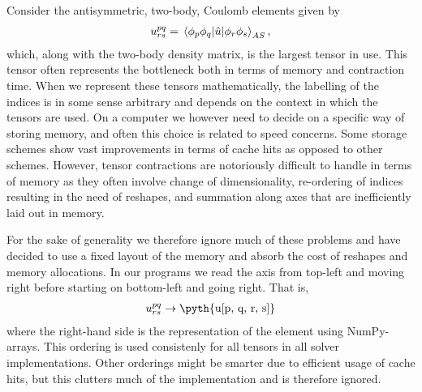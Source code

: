         Consider the antisymmetric, two-body, Coulomb elements given by
        \begin{align}
            u^{pq}_{rs}
            = \mel*{\phi_p\phi_q}{\hat{u}}{\phi_r\phi_s}_{AS},
        \end{align}
        which, along with the two-body density matrix, is the largest tensor in
        use.
        This tensor often represents the bottleneck both in terms of memory and
        contraction time.
        When we represent these tensors mathematically, the labelling of the
        indices is in some sense arbitrary and depends on the context in which
        the tensors are used.
        On a computer we however need to decide on a specific way of storing
        memory, and often this choice is related to speed concerns.
        Some storage schemes show vast improvements in terms of cache hits as
        opposed to other schemes.
        However, tensor contractions are notoriously difficult to handle in
        terms of memory as they often involve change of dimensionality,
        re-ordering of indices resulting in the need of reshapes, and summation
        along axes that are inefficiently laid out in memory.

        For the sake of generality we therefore ignore much of these problems
        and have decided to use a fixed layout of the memory and absorb the cost
        of reshapes and memory allocations.
        In our programs we read the axis from top-left and moving right before
        starting on bottom-left and going right.
        That is,
        \begin{align}
            \twoten^{pq}_{rs}
            \to \text{\pyth{u[p, q, r, s]}}
        \end{align}
        where the right-hand side is the representation of the element using
        NumPy-arrays.
        This ordering is used consistenly for all tensors in all solver
        implementations.
        Other orderings might be smarter due to efficient usage of cache hits,
        but this clutters much of the implementation and is therefore ignored.


